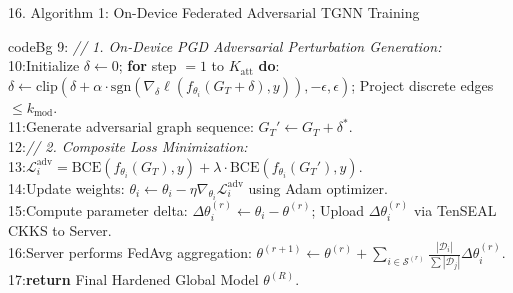 \documentclass[aspectratio=169,10pt]{beamer}
\begin{document}
\begin{frame}{16. Algorithm 1: On-Device Federated Adversarial TGNN Training}
\begin{beamercolorbox}[rounded=true,shadow=false,sep=0.20em,wd=0.98\textwidth]{codeBg}
{9: \qquad \qquad \textit{// 1. On-Device PGD Adversarial Perturbation Generation:}\\
10:\qquad \qquad Initialize $\delta \leftarrow 0$; \textbf{for} step $= 1$ to $K_{\text{att}}$ \textbf{do}: $\delta \leftarrow \text{clip}\left(\delta + \alpha \cdot \text{sgn}(\nabla_\delta \ell(f_{\theta_i}(G_T + \delta), y)), -\epsilon, \epsilon\right)$; Project discrete edges $\le k_{\text{mod}}$.\\
11:\qquad \qquad Generate adversarial graph sequence: $G_T' \leftarrow G_T + \delta^*$.\\
12:\qquad \qquad \textit{// 2. Composite Loss Minimization:}\\
13:\qquad \qquad $\mathcal{L}_i^{\text{adv}} = \text{BCE}(f_{\theta_i}(G_T), y) + \lambda \cdot \text{BCE}(f_{\theta_i}(G_T'), y)$.\\
14:\qquad \qquad Update weights: $\theta_i \leftarrow \theta_i - \eta \nabla_{\theta_i} \mathcal{L}_i^{\text{adv}}$ using Adam optimizer.\\
15:\qquad Compute parameter delta: $\Delta \theta_i^{(r)} \leftarrow \theta_i - \theta^{(r)}$; Upload $\Delta \theta_i^{(r)}$ via TenSEAL CKKS to Server.\\
16:\quad Server performs FedAvg aggregation: $\theta^{(r+1)} \leftarrow \theta^{(r)} + \sum_{i \in \mathcal{S}^{(r)}} \frac{|\mathcal{D}_i|}{\sum |\mathcal{D}_j|} \Delta \theta_i^{(r)}$.\\
17:\textbf{return} Final Hardened Global Model $\theta^{(R)}$.
}
\end{beamercolorbox}
\end{frame}
\end{document}
